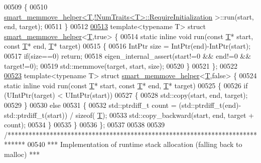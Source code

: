\begin{DoxyCode}
00509 \{
00510   \hyperlink{struct_eigen_1_1internal_1_1smart__memmove__helper}{smart\_memmove\_helper<T,!NumTraits<T>::RequireInitialization}
      >::run(start, end, target);
00511 \}
00512 
\hyperlink{struct_eigen_1_1internal_1_1smart__memmove__helper_3_01_t_00_01true_01_4}{00513} \textcolor{keyword}{template}<\textcolor{keyword}{typename} T> \textcolor{keyword}{struct }\hyperlink{struct_eigen_1_1internal_1_1smart__memmove__helper}{smart\_memmove\_helper}<\hyperlink{group___sparse_core___module}{T},true> \{
00514   \textcolor{keyword}{static} \textcolor{keyword}{inline} \textcolor{keywordtype}{void} run(\textcolor{keyword}{const} \hyperlink{group___sparse_core___module}{T}* start, \textcolor{keyword}{const} \hyperlink{group___sparse_core___module}{T}* end, \hyperlink{group___sparse_core___module}{T}* target)
00515   \{
00516     IntPtr size = IntPtr(end)-IntPtr(start);
00517     \textcolor{keywordflow}{if}(size==0) \textcolor{keywordflow}{return};
00518     eigen\_internal\_assert(start!=0 && end!=0 && target!=0);
00519     std::memmove(target, start, size);
00520   \}
00521 \};
00522 
\hyperlink{struct_eigen_1_1internal_1_1smart__memmove__helper_3_01_t_00_01false_01_4}{00523} \textcolor{keyword}{template}<\textcolor{keyword}{typename} T> \textcolor{keyword}{struct }\hyperlink{struct_eigen_1_1internal_1_1smart__memmove__helper}{smart\_memmove\_helper}<\hyperlink{group___sparse_core___module}{T},false> \{
00524   \textcolor{keyword}{static} \textcolor{keyword}{inline} \textcolor{keywordtype}{void} run(\textcolor{keyword}{const} \hyperlink{group___sparse_core___module}{T}* start, \textcolor{keyword}{const} \hyperlink{group___sparse_core___module}{T}* end, \hyperlink{group___sparse_core___module}{T}* target)
00525   \{ 
00526     \textcolor{keywordflow}{if} (UIntPtr(target) < UIntPtr(start))
00527     \{
00528       std::copy(start, end, target);
00529     \}
00530     \textcolor{keywordflow}{else}                                 
00531     \{
00532       std::ptrdiff\_t count = (std::ptrdiff\_t(end)-std::ptrdiff\_t(start)) / \textcolor{keyword}{sizeof}(
      \hyperlink{group___sparse_core___module}{T});
00533       std::copy\_backward(start, end, target + count); 
00534     \}
00535   \}
00536 \};
00537 
00538 
00539 \textcolor{comment}{/*****************************************************************************}
00540 \textcolor{comment}{*** Implementation of runtime stack allocation (falling back to malloc)    ***}

\end{DoxyCode}
